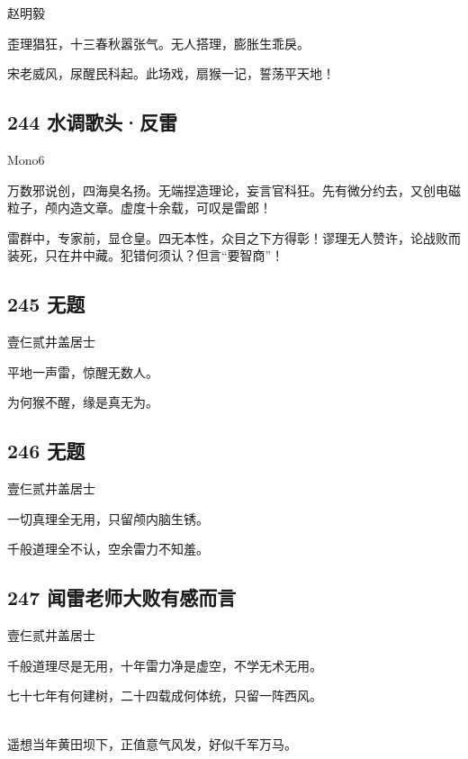 {赵明毅}

歪理猖狂，十三春秋嚣张气。无人搭理，膨胀生乖戾。

宋老威风，尿醒民科起。此场戏，扇猴一记，誓荡平天地！

\hypertarget{ux6c34ux8c03ux6b4cux5934ux53cdux96f7-1}{%
\subsection{244
水调歌头·反雷}\label{ux6c34ux8c03ux6b4cux5934ux53cdux96f7-1}}

{Mono6}

万数邪说创，四海臭名扬。无端捏造理论，妄言官科狂。先有微分约去，又创电磁粒子，颅内造文章。虚度十余载，可叹是雷郎！

雷群中，专家前，显仓皇。四无本性，众目之下方得彰！谬理无人赞许，论战败而装死，只在井中藏。犯错何须认？但言``要智商''！

\hypertarget{ux65e0ux9898-12}{%
\subsection{245 无题}\label{ux65e0ux9898-12}}

{壹仨贰井盖居士}

平地一声雷，惊醒无数人。

为何猴不醒，缘是真无为。

\hypertarget{ux65e0ux9898-13}{%
\subsection{246 无题}\label{ux65e0ux9898-13}}

{壹仨贰井盖居士}

一切真理全无用，只留颅内脑生锈。

千般道理全不认，空余雷力不知羞。

\hypertarget{ux95fbux96f7ux8001ux5e08ux5927ux8d25ux6709ux611fux800cux8a00}{%
\subsection{247
闻雷老师大败有感而言}\label{ux95fbux96f7ux8001ux5e08ux5927ux8d25ux6709ux611fux800cux8a00}}

{壹仨贰井盖居士}

千般道理尽是无用，十年雷力净是虚空，不学无术无用。

七十七年有何建树，二十四载成何体统，只留一阵西风。

~\\
遥想当年黄田坝下，正值意气风发，好似千军万马。

